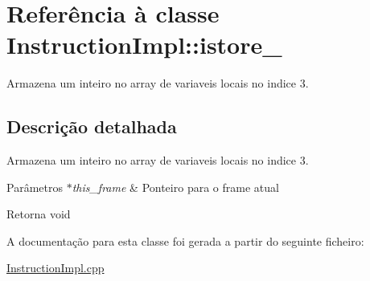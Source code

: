 \hypertarget{class_instruction_impl_1_1istore__3}{}\section{Referência à classe Instruction\+Impl\+:\+:istore\+\_}
\label{class_instruction_impl_1_1istore__3}


Armazena um inteiro no array de variaveis locais no indice 3.  




\subsection{Descrição detalhada}
Armazena um inteiro no array de variaveis locais no indice 3. 


\begin{DoxyParams}{Parâmetros}
{\em $\ast$this\+\_\+frame} & Ponteiro para o frame atual \\
\hline
\end{DoxyParams}
\begin{DoxyReturn}{Retorna}
void 
\end{DoxyReturn}


A documentação para esta classe foi gerada a partir do seguinte ficheiro\+:\begin{DoxyCompactItemize}
\item 
\hyperlink{_instruction_impl_8cpp}{Instruction\+Impl.\+cpp}\end{DoxyCompactItemize}
